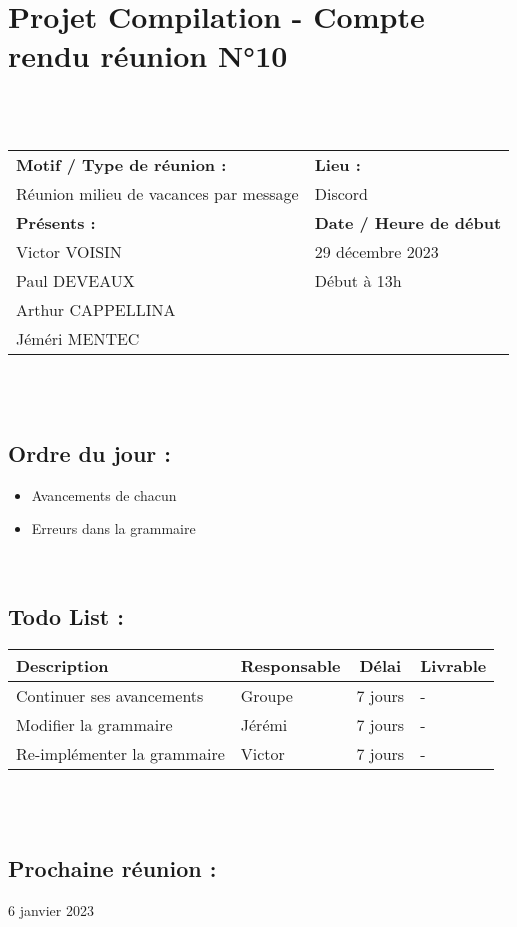 \documentclass{article}
\begin{document}
\section*{Projet Compilation - Compte rendu réunion N°10}
~\\\\

\begin{tabular}{|p{7cm}|p{6cm}|}
    \hline
    \textbf{Motif / Type de réunion :}
    & \textbf{Lieu :}
    \\
    Réunion milieu de vacances par message
    &
    Discord
    \\ \hline
    \textbf{Présents :}
    &
    \textbf{Date / Heure de début}
    \\
    Victor VOISIN &  29 décembre 2023\\
    Paul DEVEAUX & Début à 13h\\
    Arthur CAPPELLINA & \\
    Jéméri MENTEC &
    \\ \hline
\end{tabular}
\\\\

\subsection*{Ordre du jour :}
\begin{itemize}
    \item{Avancements de chacun}
    \item{Erreurs dans la grammaire}
\end{itemize}
~

\subsection*{Todo List :}
\renewcommand{\arraystretch}{1.5}
\begin{tabular}{|p{5cm}|l|c|p{4.5cm}|}
    \hline
    Description & Responsable & Délai & Livrable\\ 
    \hline
    Continuer ses avancements & Groupe & 7 jours & - \\
    Modifier la grammaire & Jérémi & 7 jours & - \\
    Re-implémenter la grammaire & Victor & 7 jours & - \\
    \hline
\end{tabular}
\\\\

\subsection*{Prochaine réunion :} 6 janvier 2023
\end{document}
